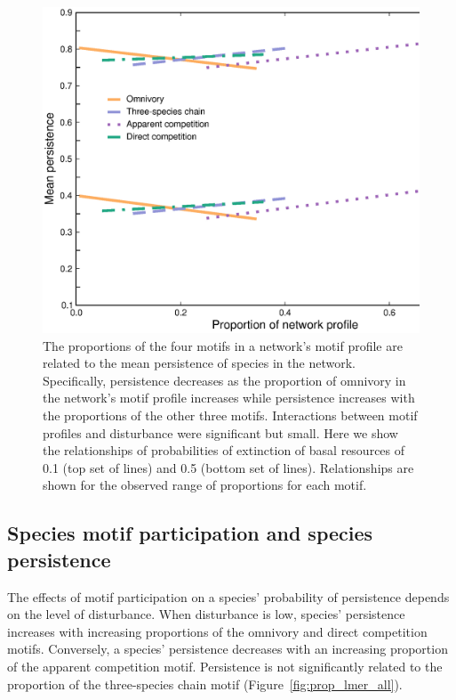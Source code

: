 \documentclass[12pt]{article}
\begin{document}
\begin{spacing}{2.0}
        \begin{figure}
            \centering
            \includegraphics[height=.5\textheight]{figures/persistence_motif_profiles.eps}
            \caption{The proportions of the four motifs in a network's motif profile are related to the mean persistence of species in the network. Specifically, persistence decreases as the proportion of omnivory in the network's motif profile increases while persistence increases with the proportions of the other three motifs. Interactions between motif profiles and disturbance were significant but small. Here we show the relationships of probabilities of extinction of basal resources of 0.1 (top set of lines) and 0.5 (bottom set of lines). Relationships are shown for the observed range of proportions for each motif.}      
            \label{fig:motif_profile_persistence}
        \end{figure}    

    \subsection*{Species motif participation and species persistence} 
    
       The effects of motif participation on a species' probability of persistence depends on the level of disturbance. When disturbance is low, species' persistence increases with increasing proportions of the omnivory and direct competition motifs. Conversely, a species' persistence decreases with an increasing proportion of the apparent competition motif. Persistence is not significantly related to the proportion of the three-species chain motif (Figure~\ref{fig:prop_lmer_all}).
            

\end{spacing}
\end{document}
